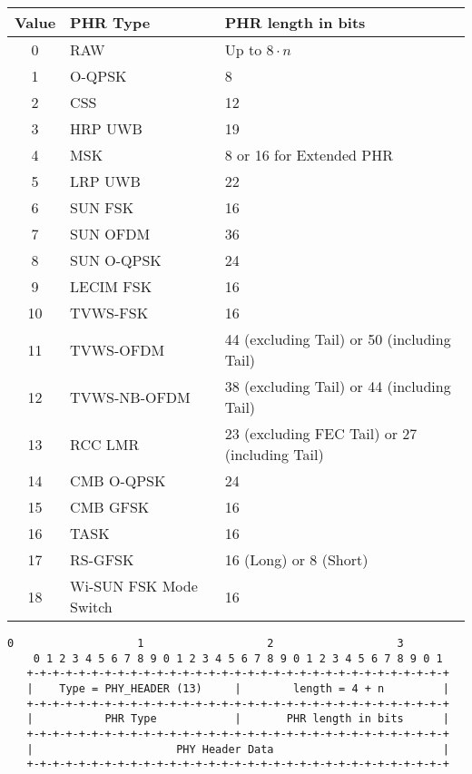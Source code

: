 \documentclass[12pt]{article}
\renewcommand\_{\textunderscore\allowbreak}
\begin{document}
\begin{tabular}{c | l | l}
    \textbf{Value}  & \textbf{PHR Type} & \textbf{PHR length in bits}\\
\hline
    0  & RAW                    & Up to $8\cdot n$\\
    1  & O-QPSK                 & 8 \\
    2  & CSS                    & 12 \\
    3  & HRP UWB                & 19 \\
    4  & MSK                    & 8 or 16 for Extended PHR \\
    5  & LRP UWB                & 22 \\
    6  & SUN FSK                & 16 \\
    7  & SUN OFDM               & 36 \\
    8  & SUN O-QPSK             & 24 \\
    9  & LECIM FSK              & 16 \\
    10 & TVWS-FSK               & 16 \\
    11 & TVWS-OFDM              & 44 (excluding Tail) or 50 (including Tail) \\
    12 & TVWS-NB-OFDM           & 38 (excluding Tail) or 44 (including Tail) \\
    13 & RCC LMR                & 23 (excluding FEC Tail) or 27 (including Tail) \\
    14 & CMB O-QPSK             & 24 \\
    15 & CMB GFSK               & 16 \\
    16 & TASK                   & 16 \\
    17 & RS-GFSK                & 16 (Long) or 8 (Short) \\
    18 & Wi-SUN FSK Mode Switch & 16 \\
\end{tabular}

\begin{Verbatim}[samepage=true]
    0                   1                   2                   3
    0 1 2 3 4 5 6 7 8 9 0 1 2 3 4 5 6 7 8 9 0 1 2 3 4 5 6 7 8 9 0 1
   +-+-+-+-+-+-+-+-+-+-+-+-+-+-+-+-+-+-+-+-+-+-+-+-+-+-+-+-+-+-+-+-+
   |    Type = PHY_HEADER (13)     |        length = 4 + n         |
   +-+-+-+-+-+-+-+-+-+-+-+-+-+-+-+-+-+-+-+-+-+-+-+-+-+-+-+-+-+-+-+-+
   |           PHR Type            |       PHR length in bits      |
   +-+-+-+-+-+-+-+-+-+-+-+-+-+-+-+-+-+-+-+-+-+-+-+-+-+-+-+-+-+-+-+-+
   |                      PHY Header Data                          |
   +-+-+-+-+-+-+-+-+-+-+-+-+-+-+-+-+-+-+-+-+-+-+-+-+-+-+-+-+-+-+-+-+
\end{Verbatim}
\end{document}
